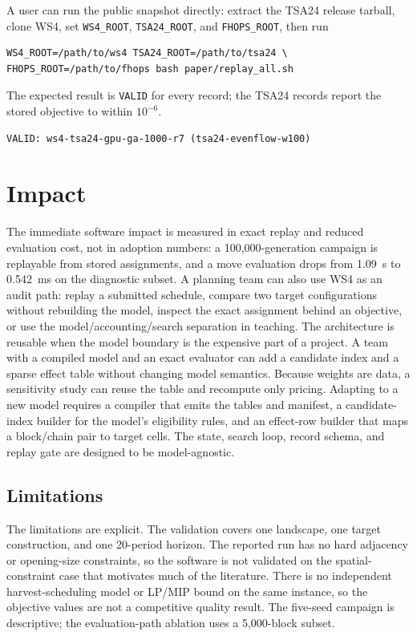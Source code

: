 \documentclass[a4paper,fleqn]{cas-sc}
\begin{document}
A user can run the public snapshot directly: extract the TSA24 release tarball, clone WS4, set
\texttt{WS4\_ROOT}, \texttt{TSA24\_ROOT}, and \texttt{FHOPS\_ROOT}, then run
\begin{verbatim}
WS4_ROOT=/path/to/ws4 TSA24_ROOT=/path/to/tsa24 \
FHOPS_ROOT=/path/to/fhops bash paper/replay_all.sh
\end{verbatim}
The expected result is \texttt{VALID} for every record; the TSA24 records report the stored objective
to within $10^{-6}$.

\begin{verbatim}
VALID: ws4-tsa24-gpu-ga-1000-r7 (tsa24-evenflow-w100)
\end{verbatim}

\section{Impact}

The immediate software impact is measured in exact replay and reduced evaluation cost, not in adoption numbers: a 100,000-generation campaign is replayable from stored assignments, and a move evaluation drops from 1.09~s to 0.542~ms on the diagnostic subset. A planning team can also use WS4 as an audit path: replay a submitted schedule, compare two target
configurations without rebuilding the model, inspect the exact assignment behind an objective, or use
the model/accounting/search separation in teaching. The architecture is reusable when the model boundary
is the expensive part of a project. A team with a
compiled model and an exact evaluator can add a candidate index and a sparse effect table without
changing model semantics. Because weights are data, a sensitivity study can reuse the
table and recompute only pricing. Adapting to a new model requires a compiler that emits the tables and
manifest, a candidate-index builder for the model's eligibility rules, and an effect-row builder that
maps a block/chain pair to target cells. The state, search loop, record schema, and replay gate are
designed to be model-agnostic.

\subsection{Limitations}

The limitations are explicit. The validation covers one landscape, one target construction, and one
20-period horizon. The reported run has no hard adjacency or opening-size constraints, so the software
is not validated on the spatial-constraint case that motivates much of the literature. There is no
independent harvest-scheduling model or LP/MIP bound on the same instance, so the objective values are
not a competitive quality result. The five-seed campaign is descriptive; the evaluation-path ablation
uses a 5,000-block subset.
\end{document}
